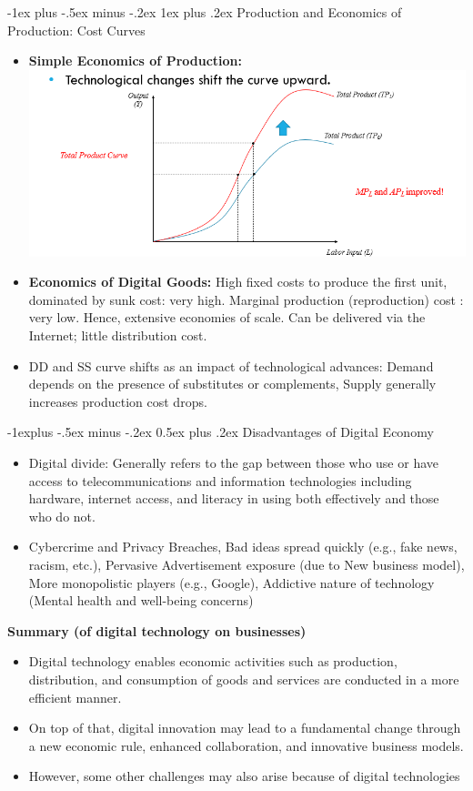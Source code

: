 \documentclass[12pt, landscape]{article}
\makeatletter
\renewcommand{\subsection}{\@startsection{subsection}{2}{0mm}%
                                {-1explus -.5ex minus -.2ex}%
                                {0.5ex plus .2ex}%
                                {\normalfont\normalsize\bfseries}}
\renewcommand{\subsubsection}{\@startsection{subsubsection}{3}{0mm}%
                                {-1ex plus -.5ex minus -.2ex}%
                                {1ex plus .2ex}%
                                {\normalfont\small\bfseries}}
\makeatother
\begin{document}
\begin{multicols*}{3}
\subsubsection{Production and Economics of Production: Cost Curves}
\begin{itemize}
\item \textbf{Simple Economics of Production:}
\includegraphics[width=0.7\linewidth]{technologicalChange}
\item \textbf{Economics of Digital Goods:} High fixed costs to produce the first unit, dominated by sunk cost: very high. Marginal production (reproduction) cost : very low. Hence, extensive economies of scale. Can be delivered via the Internet; little distribution cost.
\item DD and SS curve shifts as an impact of technological advances: Demand depends on the presence of substitutes or complements, Supply generally increases production cost drops.
\end{itemize}

\subsection{Disadvantages of Digital Economy}
\begin{itemize}
\item Digital divide: Generally refers to the gap between those who use or have access to telecommunications and information technologies including hardware, internet access, and literacy in using both effectively and those who do not.
\item Cybercrime and Privacy Breaches, Bad ideas spread quickly (e.g., fake news, racism, etc.), Pervasive Advertisement exposure (due to New business model), More monopolistic players (e.g., Google), Addictive nature of technology (Mental health and well-being concerns)
\end{itemize}

\textbf{Summary (of digital technology on businesses)}
\begin{itemize}
\item Digital technology enables economic activities such as production, distribution, and consumption of goods and services are conducted in a more efficient manner.
\item On top of that, digital innovation may lead to a fundamental change through a new economic rule, enhanced collaboration, and innovative business models.
\item However, some other challenges may also arise because of digital technologies
\end{itemize}


\end{multicols*}
\end{document}
